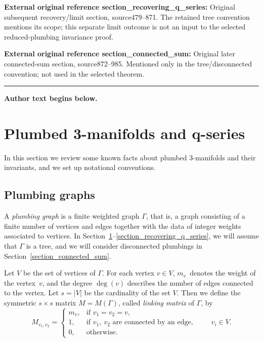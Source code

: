 \documentclass[11pt]{article}
\numberwithin{equation}{section}
\numberwithin{equation}{section}
\begin{document}
\noindent\textbf{External original reference section\_recovering\_q\_series:} Original subsequent recovery/limit section, source479–871. The retained tree convention mentions its scope; this separate limit outcome is not an input to the selected reduced-plumbing invariance proof.\par
\noindent\textbf{External original reference section\_connected\_sum:} Original later connected-sum section, source872–985. Mentioned only in the tree/disconnected convention; not used in the selected theorem.\par
\medskip\hrule\medskip\noindent\textbf{Author text begins below.}\par
\setcounter{section}{1}
\section[Plumbed 3-manifolds and q-series]{Plumbed 3-manifolds and $\boldsymbol{q}$-series}
\label{section_plumbed_3-manifolds}

In this section we review some known facts about plumbed 3-manifolds and their invariants, and we set up notational conventions.

\subsection{Plumbing graphs}\label{subsection_plumbing_graphs}

A \textit{plumbing graph} is a finite weighted graph $ \Gamma $, that is, a graph consisting of a finite number of vertices and edges together with the data of integer weights associated to vertices. In Section~\ref{section_plumbed_3-manifolds}--\ref{section_recovering_q_series}, we will assume that $ \Gamma $ is a tree, and we will consider disconnected plumbings in Section~\ref{section_connected_sum}.

Let $ V $ be the set of vertices of $ \Gamma $. For each vertex $ v\in V $, $ m_v $~denotes the weight of the vertex~$ v $, and the degree $ \deg(v) $ describes the number of edges connected to the vertex. Let $ s=|V| $ be the cardinality of the set $ V $. Then we define the symmetric $ s\times s $ matrix $ M=M(\Gamma) $, called \textit{linking matrix} of $ \Gamma $, by
\begin{equation*}
	M_{v_1,v_2}=
	\begin{cases}
		m_v,&\text{if } v_1=v_2=v,\\
		1,&\text{if }v_1, \ v_2 \text{ are connected by an edge},\\
		0,&\text{otherwise}.
	\end{cases}
	\qquad v_i\in V.
\end{equation*}
\end{document}
